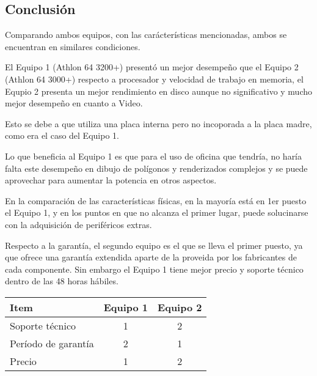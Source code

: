 \subsection{Conclusión}
Comparando ambos equipos, con las carácterísticas mencionadas, ambos se 
encuentran en similares condiciones.

El Equipo 1 (Athlon 64 3200+) presentó un mejor desempeño que el Equipo 2 
(Athlon 64 3000+) respecto a procesador y velocidad de trabajo en memoria,
el Equpio 2 presenta un mejor rendimiento en disco aunque no significativo
y mucho mejor desempeño en cuanto a Video.

Esto se debe a que utiliza una placa interna pero no incoporada a la placa
madre, como era el caso del Equipo 1.

Lo que beneficia al Equipo 1 es que para el uso de oficina que tendría, no
haría falta este desempeño en dibujo de polígonos y renderizados complejos
y se puede aprovechar para aumentar la potencia en otros aspectos.

En la comparación de las características físicas, en la mayoría está en 1er 
puesto el Equipo 1, y en los puntos en que no alcanza el primer lugar, puede 
solucinarse con la adquisición de periféricos extras.

Respecto a la garantía, el segundo equipo es el que se lleva el primer puesto, 
ya que ofrece una garantía extendida aparte de la proveida por los fabricantes 
de cada componente. Sin embargo el Equipo 1 tiene mejor precio y soporte 
técnico dentro de las 48 horas hábiles.

\begin{center}
\begin{tabular}{|lcc|} \hline
\footnotesize\textbf{Item} & \footnotesize\textbf{Equipo 1} & \footnotesize\textbf{Equipo 2} \\\hline
Soporte técnico & 1 & 2 \\\hline
Período de garantía & 2 & 1 \\\hline
Precio & 1 & 2 \\\hline
\end{tabular}
\end{center}

